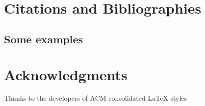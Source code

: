 \documentclass[
twocolumn,
]{ceurart}
\begin{document}
\section{Citations and Bibliographies}

\subsection{Some examples}

\section{Acknowledgments}

\begin{acknowledgments}
  Thanks to the developers of ACM consolidated LaTeX styles
\end{acknowledgments}


\end{document}

